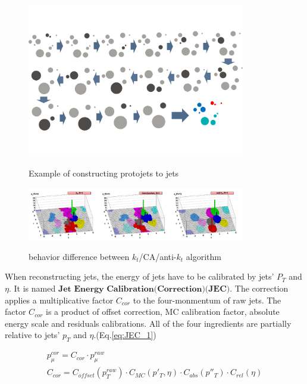 		\begin{figure}[H]
		\centering{}
	    	\includegraphics[width=0.85\textwidth]{Figures/PhysObj/jet_algo.pdf}\\
		\caption{Example of constructing protojets to jets}
		\label{PhysObj:fig:jet_algo}
		\end{figure}
		\FloatBarrier

		\begin{figure}[H]
		\centering{}
	    	\includegraphics[width=0.85\textwidth]{Figures/PhysObj/3type_jetreco.pdf}\\
		\caption{behavior difference between $k_t$/CA/anti-$k_t$ algorithm \cite{Atkin_2015}}
		\label{PhysObj:fig:3type_jetreco}
		\end{figure}
		\FloatBarrier

		When reconstructing jets, the energy of jets have to be calibrated by jets' $P_T$ and $\eta$. It is named $\textbf{Jet Energy Calibration(Correction)(JEC)}$\cite{collaboration_2011_JEC}. The correction applies a multiplicative factor $C_{cor}$ to the four-monmentum of raw jets. The factor $C_{cor}$ is a product of offset correction, MC calibration factor, absolute energy scale and residuals calibrations. All of the four ingredients are partially relative to jets' $p_T$ and $\eta$.(Eq.\ref{eq:JEC_1})

		\begin{equation}
		\begin{split}
		p_{\mu}^{cor} = C_{cor} \cdot p_{\mu}^{raw} \; \; \; \; \; \; \; \; \; \; \; \; \; \; \; \; \; \; \; \; \; \; \; \; \; \; \; \; \; \; \; \; \; \; \; \; \; \; \; \; \; \; \; \; \; \; \; \; \\
		C_{cor} = C_{offset}(p_T^{raw}) \cdot C_{MC}(p'_T,\eta) \cdot C_{abs}(p''_T) \cdot C_{rel}(\eta)
		\end{split}
		\label{eq:JEC_1}
		\end{equation}
		\FloatBarrier

